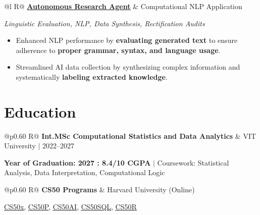 \documentclass[a4paper,10pt]{article}
\newcommand{\ulink}[2]{\href{#1}{\uline{#2}}}
\newcommand{\subheading}[1]{{\color[HTML]{0A0A0A}\fontsize{12}{14}\selectfont\bfseries #1}}
\newcommand{\techstack}[1]{{\color[HTML]{5C5C5C}\fontsize{10.5}{12.5}\selectfont\itshape #1}}
\newcommand{\meta}[1]{{\color[HTML]{5C5C5C}\fontsize{10.5}{12.5}\selectfont #1}}
\begin{document}
\begin{tabularx}{\linewidth}{@{}l R@{}}
\subheading{\ulink{https://github.com/su-jin1425/Autonomous-Research-Agent}{Autonomous Research Agent}} & \meta{Computational NLP Application}
\end{tabularx}
\vspace{1pt}
\techstack{Linguistic Evaluation, NLP, Data Synthesis, Rectification Audits}
\begin{itemize}[nosep, leftmargin=1.5em, itemsep=1pt, topsep=2pt]
  \item {\color[HTML]{0A0A0A}\fontsize{11}{14}\selectfont Enhanced NLP performance by \textbf{evaluating generated text} to ensure adherence to \textbf{proper grammar, syntax, and language usage}.}
  \item {\color[HTML]{0A0A0A}\fontsize{11}{14}\selectfont Streamlined AI data collection by synthesizing complex information and systematically \textbf{labeling extracted knowledge}.}
\end{itemize}

\vspace{1pt}

\section{Education}
\vspace{1pt}

\begin{tabularx}{\linewidth}{@{}p{0.60\linewidth} R@{}}
\subheading{Int.MSc Computational Statistics and Data Analytics} & \meta{VIT University $|$ 2022--2027}
\end{tabularx}
\vspace{1pt}
{\color[HTML]{3A3A3A}\fontsize{11}{14}\selectfont \textbf{Year of Graduation: 2027 : 8.4/10 CGPA} $|$ Coursework: Statistical Analysis, Data Interpretation, Computational Logic}

\begin{tabularx}{\linewidth}{@{}p{0.60\linewidth} R@{}}
\subheading{CS50 Programs} & \meta{Harvard University (Online)}
\end{tabularx}
\vspace{1pt}
{\color[HTML]{3A3A3A}\fontsize{11}{14}\selectfont \ulink{https://cs50.harvard.edu/certificates/b14b78df-e05c-413e-a607-1dd27303053a}{CS50x}, \ulink{https://cs50.harvard.edu/certificates/32477052-9db4-49c4-a5a4-d7e58429ca2c}{CS50P}, \ulink{https://cs50.harvard.edu/certificates/9cdb4d4a-1250-4f8e-9fd7-191864e0f919}{CS50AI}, \ulink{https://cs50.harvard.edu/certificates/bc486f24-f085-4e61-8536-80940b97a1b9}{CS50SQL}, \ulink{https://cs50.harvard.edu/certificates/666838e6-a053-4d82-b179-a60fe745fd84}{CS50R}}
\end{document}
